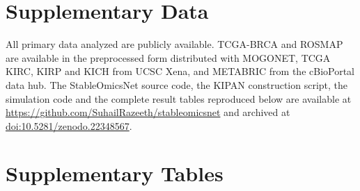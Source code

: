 \documentclass[utf8]{frontiers_suppmat}
\begin{document}
\onecolumn
{}

\title[Supplementary Material]{{}}
\maketitle

\section{Supplementary Data}

All primary data analyzed are publicly available. TCGA-BRCA and ROSMAP are available in the preprocessed form distributed with MOGONET, TCGA KIRC, KIRP and KICH from UCSC Xena, and METABRIC from the cBioPortal data hub. The StableOmicsNet source code, the KIPAN construction script, the simulation code and the complete result tables reproduced below are available at \url{https://github.com/SuhailRazeeth/stableomicsnet} and archived at \href{https://doi.org/10.5281/zenodo.22348567}{doi:10.5281/zenodo.22348567}.

\section{Supplementary Tables}

\footnotesize
\end{document}
